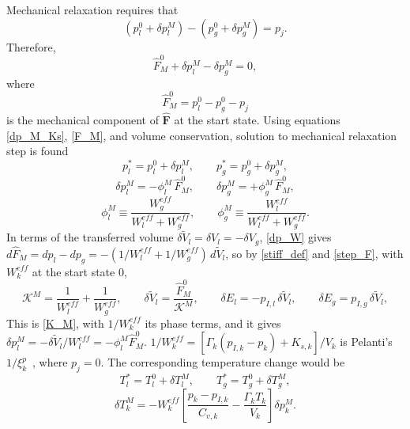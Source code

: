 Mechanical relaxation requires that
\begin{equation}
\left(p_l^0+\delta p_l^M\right) - \left(p_g^0+\delta p_g^M\right) = p_{j}.
\end{equation}
Therefore,
\begin{equation}
\hat{F}_M^0 + \delta p_l^M - \delta p_g^M = 0,
\end{equation}
where
\begin{equation}\label{F_M}
\hat{F}_M^0 = p_l^0 - p_g^0 - p_{j}
\end{equation}
is the mechanical component of $\hat{\boldsymbol{F}}$ at the start state. Using equations \eqref{dp_M_Ks}, \eqref{F_M}, and volume conservation, solution to mechanical relaxation step is found
\begin{equation}
p_l^* = p_l^0 + \delta p_l^M,\qquad p_g^* = p_g^0 + \delta p_g^M,
\end{equation}
\begin{equation}
\delta p_l^M=-\phi_l^M\,\hat{F}_M^0,\qquad \delta p_g^M=+\phi_g^M\,\hat{F}_M^0,
\end{equation}
\begin{equation}\label{phi_M}
\phi_l^M\equiv \frac{W_g^{eff}}{W_l^{eff}+W_g^{eff}},\qquad \phi_g^M\equiv \frac{W_l^{eff}}{W_l^{eff}+W_g^{eff}}.
\end{equation}
In terms of the transferred volume $\delta\tilde{V}_l=\delta V_l=-\delta V_g$, \eqref{dp_W} gives $d\hat{F}_M=dp_l-dp_g=-(1/W_l^{eff}+1/W_g^{eff})\,d\tilde{V}_l$, so by \eqref{stiff_def} and \eqref{step_F}, with $W_k^{eff}$ at the start state $0$,
\begin{equation}\label{K_M_phase}
\mathcal{K}^M=\frac1{W_l^{eff}}+\frac1{W_g^{eff}},\qquad \delta\tilde{V}_l=\frac{\hat{F}_M^0}{\mathcal{K}^M},\qquad \delta E_l=-p_{I,l}\,\delta\tilde{V}_l,\qquad \delta E_g=p_{I,g}\,\delta\tilde{V}_l,
\end{equation}
This is \eqref{K_M}, with $1/W_k^{eff}$ its phase terms, and it gives $\delta p_l^M=-\delta\tilde{V}_l/W_l^{eff}=-\phi_l^M\hat{F}_M^0$. $1/W_k^{eff}=[\Gamma_k(p_{I,k}-p_k)+K_{s,k}]/V_k$ is Pelanti's $1/\xi_k^p$~\cite[eq.~(51)]{Pelanti2022}, where $p_{j}=0$.
\noindent The corresponding temperature change would be
\begin{equation}
T_l^* = T_l^0 + \delta T_l^M,\qquad T_g^* = T_g^0 + \delta T_g^M,
\end{equation}
\begin{equation}
\delta T_k^M = - W_k^{eff} \left[ \frac{p_k-p_{I,k}}{C_{v,k}} - \frac{\Gamma_k T_k}{V_k} \right] \delta p_k^M.
\end{equation}
